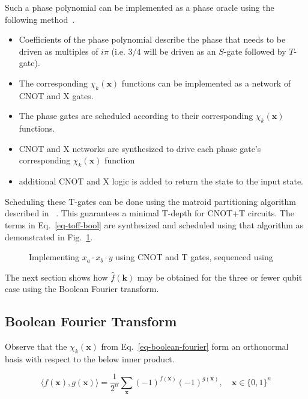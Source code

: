 Such a phase polynomial can be implemented as a phase oracle using the following
method~\cite{amy-meet-in-middle}.

\begin{itemize}
\item Coefficients of the phase polynomial describe the phase that needs to be driven
  as multiples of $i\pi$ (i.e. $3/4$ will be driven as an $S$-gate followed by $T$-gate).
\item The corresponding $\chi_k(\mathbf{x})$ functions can be implemented as a network
  of CNOT and X gates.
\item The phase gates are scheduled according to their corresponding $\chi_k(\mathbf{x})$
  functions.
\item CNOT and X networks are synthesized to drive each phase gate's corresponding
  $\chi_k(\mathbf{x})$ function
\item additional CNOT and X logic is added to return the state to the input state.
\end{itemize}

Scheduling these T-gates can be done using the matroid partitioning algorithm described in
~\cite{bib-amy-matroid}. This guarantees a minimal T-depth for CNOT+T circuits.
The terms in Eq.~\ref{eq-toff-bool} are synthesized and scheduled using that algorithm as
demonstrated in Fig.~\ref{fig-toff-mark-matroid}.

\begin{figure}[t]
  \centering
  \scalebox{0.7} {
    
  }
  \caption{Implementing $x_a \cdot x_b \cdot y$ using CNOT and T gates, sequenced using~\cite{bib-amy-matroid}}
  \label{fig-toff-mark-matroid}
\end{figure}

The next section shows how $\hat{f}(\mathbf{k})$ may be obtained for the three or fewer qubit case using the
Boolean Fourier transform.

\subsection{Boolean Fourier Transform}
\label{Pre:Four}
Observe that the $\chi_k(\mathbf{x})$ from Eq.~\ref{eq-boolean-fourier} form an orthonormal basis with respect
to the below inner product.

\begin{equation}
  \label{eq-inner-prod}
  \langle f(\mathbf{x}) , g(\mathbf{x}) \rangle = \frac{1}{2^n} \sum_{\mathbf{x}} (-1)^{f(\mathbf{x})} (-1)^{g(\mathbf{x})}, \quad \mathbf{x} \in \{0,1\}^n
\end{equation}

